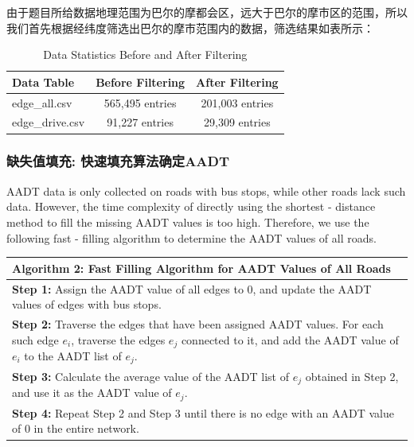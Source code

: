\documentclass[12pt, a4paper, oneside]{ctexart}
\begin{document}
由于题目所给数据地理范围为巴尔的摩都会区，远大于巴尔的摩市区的范围，所以我们首先根据经纬度筛选出巴尔的摩市范围内的数据，筛选结果如表所示：

\begin{table}[H]
  \centering
  \caption{Data Statistics Before and After Filtering}
  \label{tab:data_filtering_stats}
  \begin{tabular}{@{}lcc@{}}
      \toprule
      \textbf{Data Table} & \textbf{Before Filtering} & \textbf{After Filtering} \\
      \midrule
      edge\_all.csv & 565,495 entries & 201,003 entries \\
      edge\_drive.csv & 91,227 entries & 29,309 entries \\
      \bottomrule
  \end{tabular}
\end{table}

\subsubsection{缺失值填充: 快速填充算法确定AADT}

AADT data is only collected on roads with bus stops, while other roads lack such data. However, the time complexity of directly using the shortest - distance method to fill the missing AADT values is too high. Therefore, we use the following fast - filling algorithm to determine the AADT values of all roads.

\begin{table}[H]
  \centering
  \label{tab:AADTFilling}
  \begin{tabular}{@{}p{}@{}}
  \toprule
  \textbf{Algorithm 2: Fast Filling Algorithm for AADT Values of All Roads} \\ 
  \midrule
  \textbf{Step 1:} Assign the AADT value of all edges to 0, and update the AADT values of edges with bus stops. \\
  \textbf{Step 2:} Traverse the edges that have been assigned AADT values. For each such edge \(e_i\), traverse the edges \(e_j\) connected to it, and add the AADT value of \(e_i\) to the AADT list of \(e_j\). \\
  \textbf{Step 3:} Calculate the average value of the AADT list of \(e_j\) obtained in Step 2, and use it as the AADT value of \(e_j\). \\
  \textbf{Step 4:} Repeat Step 2 and Step 3 until there is no edge with an AADT value of 0 in the entire network. \\ \bottomrule
  \end{tabular}
\end{table}
\end{document}
